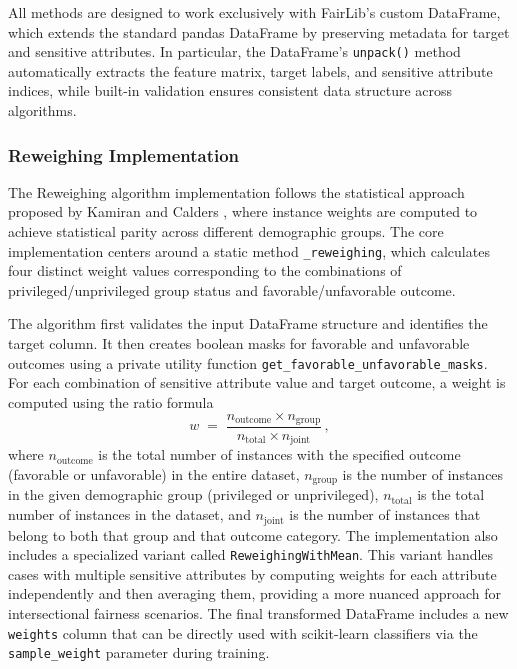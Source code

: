 \documentclass[12pt,a4paper,openright,twoside]{book}
\begin{document}
All methods are designed to work exclusively with FairLib’s custom DataFrame, which extends the standard pandas DataFrame by preserving metadata for target and sensitive attributes. In particular, the DataFrame’s \texttt{unpack()} method automatically extracts the feature matrix, target labels, and sensitive attribute indices, while built-in validation ensures consistent data structure across algorithms.

\subsubsection{Reweighing Implementation}
The Reweighing algorithm implementation follows the statistical approach proposed by Kamiran and Calders \cite{kamiran2013quantifying}, where instance weights are computed to achieve statistical parity across different demographic groups. The core implementation centers around a static method \texttt{\_reweighing}, which calculates four distinct weight values corresponding to the combinations of privileged/unprivileged group status and favorable/unfavorable outcome.

The algorithm first validates the input DataFrame structure and identifies the target column. It then creates boolean masks for favorable and unfavorable outcomes using a private utility function \texttt{get\_favorable\_unfavorable\_masks}. For each combination of sensitive attribute value and target outcome, a weight is computed using the ratio formula 
\[ 
w \;=\; \frac{n_{\text{outcome}} \times n_{\text{group}}}{\,n_{\text{total}} \times n_{\text{joint}}\,}\,,
\] 
where $n_{\text{outcome}}$ is the total number of instances with the specified outcome (favorable or unfavorable) in the entire dataset, $n_{\text{group}}$ is the number of instances in the given demographic group (privileged or unprivileged), $n_{\text{total}}$ is the total number of instances in the dataset, and $n_{\text{joint}}$ is the number of instances that belong to both that group and that outcome category. The implementation also includes a specialized variant called \texttt{ReweighingWithMean}. This variant handles cases with multiple sensitive attributes by computing weights for each attribute independently and then averaging them, providing a more nuanced approach for intersectional fairness scenarios. The final transformed DataFrame includes a new \texttt{weights} column that can be directly used with scikit-learn classifiers via the \texttt{sample\_weight} parameter during training.
\end{document}
